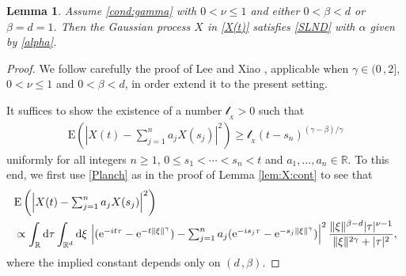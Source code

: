 \documentclass[reqno]{amsart}
\newcommand{\<}{\langle}
\renewcommand{\>}{\rangle}
\newcommand{\R}{\mathbb{R}}
\newcommand{\E}{\mathrm{E}}
\newcommand{\1}{\mathbb{1}}
\renewcommand{\d}{{\rm d}}
\newcommand{\e}{{\rm e}}
\renewcommand{\ge}{\geqslant}
\renewcommand{\le}{\leqslant}
\newtheorem{lemma}[stat]{Lemma}
\theoremstyle{definition}
\numberwithin{equation}{section}
\begin{document}
\begin{lemma}\label{lem:X:SLND}
	Assume \eqref{cond:gamma} with $0 < \nu \le 1$ and either $0<\beta<d$ or $\beta=d=1$.
	Then the Gaussian process $X$ in \eqref{X(t)}
	satisfies \eqref{SLND} with $\alpha$ given by \eqref{alpha}.
\end{lemma}

\begin{proof}
	We follow carefully the proof of Lee and Xiao \cite[Lemma 7.3]{LX23}, applicable
	when $\gamma\in(0\,,2]$, $0 < \nu \le 1$ and $0<\beta < d$, in order extend it to the present setting.
	
	It suffices to show the existence of a number $\mathscr{l}_{_X}>0$ such that
	\begin{align*}\textstyle
		\E\left(\left| X(t) - \sum_{j=1}^n a_j X(s_j)\right|^2 \right)
		\ge \mathscr{l}_{_X} (t-s_n)^{(\gamma-\beta)/\gamma}
	\end{align*}
	uniformly for all integers $n\ge 1$, $0\le s_1 < \cdots < s_n < t$ and $a_1,\dots, a_n \in \R$.
	To this end, we first use \eqref{Planch} as in the proof of Lemma \ref{lem:X:cont} to see that
	\begin{align}\label{SLND:SHE}
		&\textstyle\E\left(\left| X(t) - \sum_{j=1}^n a_j X(s_j)\right|^2 \right)\\\notag
		&\propto\int_{\R} \d\tau\int_{\R^d}\d\xi\,
			\textstyle
			\left| (\e^{-it\tau} - \e^{-t \|\xi\|^\gamma}) - \sum_{j=1}^n a_j 
			(\e^{-is_j\tau}-\e^{-s_j \|\xi \|^\gamma}) \right|^2 
			\displaystyle\frac{\|\xi\|^{\beta-d}|\tau|^{\nu-1}}{\|\xi\|^{2\gamma} + |\tau|^2},
	\end{align}
	where the implied constant depends only on $(d\,,\beta)$. 
	

\end{proof}
\end{document}
